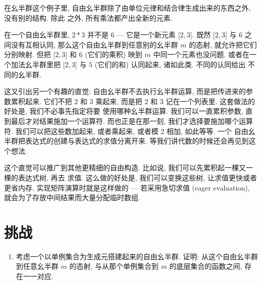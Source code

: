 \noindent
在幺半群这个例子里, 自由幺半群除了由单位元律和结合律生成出来的东西之外, 没有别的结构. 除此
之外, 所有乘法都产出全新的元素.

在一个自由幺半群里, $2 * 3$ 并不是 $6$ --- 它是一个新元素 ${[}2, 3{]}$. 既然
${[}2, 3{]}$ 与 $6$ 之间没有互相认同, 那么这个自由幺半群到任意别的幺半群 $m$ 的态射,
就允许把它们分别映射. 但把 ${[}2, 3{]}$ 和 $6$ (它们的乘积) 映到 $m$ 中同一个元素也没问题.
或者在一个加法幺半群里把 ${[}2, 3{]}$ 与 $5$ (它们的和) 认同起来, 诸如此类. 不同的认同给出
不同的幺半群.

这又引出另一个有趣的直觉: 自由幺半群不去执行幺半群运算, 而是把传进来的参数累积起来. 它们不把
$2$ 和 $3$ 乘起来, 而是把 $2$ 和 $3$ 记在一个列表里. 这套做法的好处是, 我们不必事先指定将要
使用哪种幺半群运算. 我们可以一直累积参数, 直到最后才对结果施加一个运算符. 而也正是在那一刻,
我们才选择要施加哪个运算符. 我们可以把这些数加起来, 或者乘起来, 或者模 2 相加, 如此等等. 一个
自由幺半群把表达式的创建与表达式的求值分离开来. 等我们讲代数的时候还会再见到这个想法.

这个直觉可以推广到其他更精细的自由构造. 比如说, 我们可以先累积起一棵又一棵的表达式树, 再去
求值. 这么做的好处是, 我们可以变换这些树, 让求值更快或者更省内存. 实现矩阵演算时就是这样做的
--- 若采用急切求值 (eager evaluation), 就会为了存放中间结果而大量分配临时数组.

\section{挑战}

\begin{enumerate}
  \tightlist
  \item
        考虑一个以单例集合为生成元搭建起来的自由幺半群. 证明: 从这个自由幺半群到任意幺半群
        $m$ 的态射, 与从那个单例集合到 $m$ 的底层集合的函数之间, 存在一一对应.
\end{enumerate}
